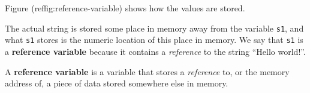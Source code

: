 Figure (ref{fig:reference-variable}) shows how the values are stored.

%

The actual string is stored some place in memory away from the variable \texttt{s1}, and what \texttt{s1} stores is the numeric location of this place in memory.  We say that \texttt{s1} is a \textbf{reference variable} because it contains a \textit{reference} to the string ``Hello world!''.

    A \textbf{reference variable} is a variable that stores a \textit{reference} to, or the memory address of, a piece of data stored somewhere else in memory.
